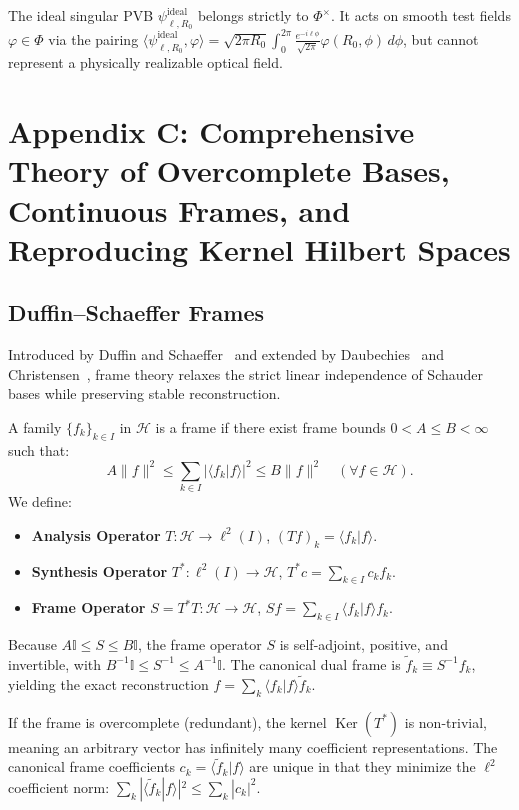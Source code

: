 \documentclass{optica-article}
\begin{document}
The ideal singular PVB $\psi_{\ell, R_0}^{\text{ideal}}$ belongs strictly to $\Phi^\times$. It acts on smooth test fields $\varphi \in \Phi$ via the pairing $\langle \psi_{\ell, R_0}^{\text{ideal}}, \varphi \rangle = \sqrt{2\pi R_0} \int_0^{2\pi} \frac{e^{-i \ell \phi}}{\sqrt{2\pi}} \varphi(R_0, \phi) \, d\phi$, but cannot represent a physically realizable optical field.

\section{Appendix C: Comprehensive Theory of Overcomplete Bases, Continuous Frames, and Reproducing Kernel Hilbert Spaces}
\label{app:frames}

\subsection{Duffin--Schaeffer Frames}

Introduced by Duffin and Schaeffer~\cite{Duffin1952} and extended by Daubechies~\cite{Daubechies1990} and Christensen~\cite{Christensen2016}, frame theory relaxes the strict linear independence of Schauder bases while preserving stable reconstruction.

A family $\{f_k\}_{k \in I}$ in $\mathcal{H}$ is a frame if there exist frame bounds $0 < A \le B < \infty$ such that:
\begin{equation}
A \|f\|^2 \le \sum_{k \in I} |\langle f_k | f \rangle|^2 \le B \|f\|^2 \quad (\forall f \in \mathcal{H}).
\end{equation}
We define:
\begin{itemize}
    \item \textbf{Analysis Operator} $T: \mathcal{H} \to \ell^2(I)$, $(T f)_k = \langle f_k | f \rangle$.
    \item \textbf{Synthesis Operator} $T^*: \ell^2(I) \to \mathcal{H}$, $T^* c = \sum_{k \in I} c_k f_k$.
    \item \textbf{Frame Operator} $S = T^* T: \mathcal{H} \to \mathcal{H}$, $S f = \sum_{k \in I} \langle f_k | f \rangle f_k$.
\end{itemize}
Because $A \mathbb{I} \le S \le B \mathbb{I}$, the frame operator $S$ is self-adjoint, positive, and invertible, with $B^{-1} \mathbb{I} \le S^{-1} \le A^{-1} \mathbb{I}$. The canonical dual frame is $\widetilde{f}_k \equiv S^{-1} f_k$, yielding the exact reconstruction $f = \sum_k \langle f_k | f \rangle \widetilde{f}_k$.

If the frame is overcomplete (redundant), the kernel $\operatorname{Ker}(T^*)$ is non-trivial, meaning an arbitrary vector has infinitely many coefficient representations. The canonical frame coefficients $c_k = \langle \widetilde{f}_k | f \rangle$ are unique in that they minimize the $\ell^2$ coefficient norm: $\sum_k |\langle \widetilde{f}_k | f \rangle|^2 \le \sum_k |c_k|^2$.
\end{document}
